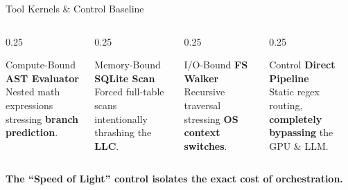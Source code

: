 \documentclass[aspectratio=169, 10pt]{beamer}
\begin{document}
\begin{frame}{Tool Kernels \& Control Baseline}
  \begin{columns}
    \begin{column}{0.25\textwidth}
      \begin{block}{Compute-Bound}
        \textbf{AST Evaluator}\\[0.2em]
        {\small Nested math expressions stressing \textbf{branch prediction}.}
      \end{block}
    \end{column}
    \begin{column}{0.25\textwidth}
      \begin{block}{Memory-Bound}
        \textbf{SQLite Scan}\\[0.2em]
        {\small Forced full-table scans intentionally thrashing the \textbf{LLC}.}
      \end{block}
    \end{column}
    \begin{column}{0.25\textwidth}
      \begin{block}{I/O-Bound}
        \textbf{FS Walker}\\[0.2em]
        {\small Recursive traversal stressing \textbf{OS context switches}.}
      \end{block}
    \end{column}
    \begin{column}{0.25\textwidth}
      \begin{alertblock}{Control}
        \textbf{Direct Pipeline}\\[0.2em]
        {\small Static regex routing, \textbf{completely bypassing} the GPU \& LLM.}
      \end{alertblock}
    \end{column}
  \end{columns}
  \vspace{0.8em}
  \begin{center}
    \textcolor{neonmint}{\textbf{The ``Speed of Light'' control isolates the exact cost of orchestration.}}
  \end{center}
\end{frame}
\end{document}
